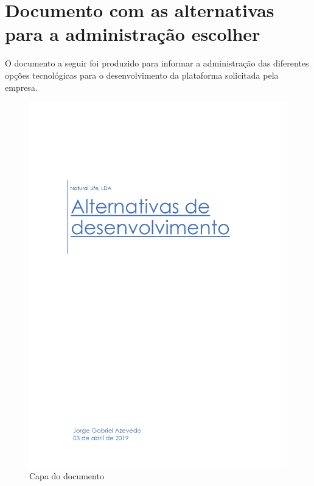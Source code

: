 \chapter{Documento com as alternativas para a administração escolher }
\label{anexo:A}

O documento a seguir foi produzido para informar a administração das diferentes opções tecnológicas para o desenvolvimento da plataforma solicitada pela empresa.

\newpage

\begin{figure}[H]
	\centering
	\includegraphics[width=\linewidth, frame]{figuras/Alternativas/pag0.jpg}
	\caption{Capa do documento}
	\label{fig:anexo_a_capa}
\end{figure}
\newpage

